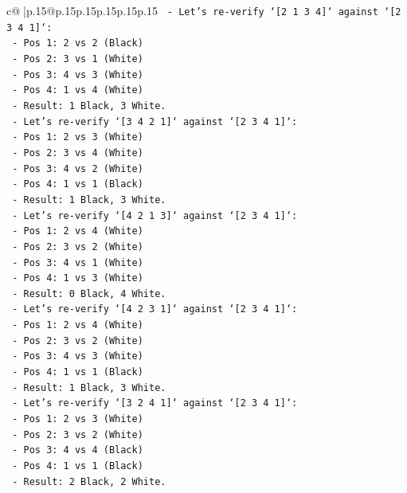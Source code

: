\documentclass{article}
\begin{document}
{\begin{supertabular}{c@{$\;$}|p{.15\linewidth}@{}p{.15\linewidth}p{.15\linewidth}p{.15\linewidth}p{.15\linewidth}p{.15\linewidth}}
{{{\texttt{  {-} Let's re{-}verify `{[}2 1 3 4{]}` against `{[}2 3 4 1{]}`:} \\
\texttt{    {-} Pos 1: 2 vs 2 (Black)} \\
\texttt{    {-} Pos 2: 3 vs 1 (White)} \\
\texttt{    {-} Pos 3: 4 vs 3 (White)} \\
\texttt{    {-} Pos 4: 1 vs 4 (White)} \\
\texttt{    {-} Result: 1 Black, 3 White.} \\
\texttt{  {-} Let's re{-}verify `{[}3 4 2 1{]}` against `{[}2 3 4 1{]}`:} \\
\texttt{    {-} Pos 1: 2 vs 3 (White)} \\
\texttt{    {-} Pos 2: 3 vs 4 (White)} \\
\texttt{    {-} Pos 3: 4 vs 2 (White)} \\
\texttt{    {-} Pos 4: 1 vs 1 (Black)} \\
\texttt{    {-} Result: 1 Black, 3 White.} \\
\texttt{  {-} Let's re{-}verify `{[}4 2 1 3{]}` against `{[}2 3 4 1{]}`:} \\
\texttt{    {-} Pos 1: 2 vs 4 (White)} \\
\texttt{    {-} Pos 2: 3 vs 2 (White)} \\
\texttt{    {-} Pos 3: 4 vs 1 (White)} \\
\texttt{    {-} Pos 4: 1 vs 3 (White)} \\
\texttt{    {-} Result: 0 Black, 4 White.} \\
\texttt{  {-} Let's re{-}verify `{[}4 2 3 1{]}` against `{[}2 3 4 1{]}`:} \\
\texttt{    {-} Pos 1: 2 vs 4 (White)} \\
\texttt{    {-} Pos 2: 3 vs 2 (White)} \\
\texttt{    {-} Pos 3: 4 vs 3 (White)} \\
\texttt{    {-} Pos 4: 1 vs 1 (Black)} \\
\texttt{    {-} Result: 1 Black, 3 White.} \\
\texttt{  {-} Let's re{-}verify `{[}3 2 4 1{]}` against `{[}2 3 4 1{]}`:} \\
\texttt{    {-} Pos 1: 2 vs 3 (White)} \\
\texttt{    {-} Pos 2: 3 vs 2 (White)} \\
\texttt{    {-} Pos 3: 4 vs 4 (Black)} \\
\texttt{    {-} Pos 4: 1 vs 1 (Black)} \\
\texttt{    {-} Result: 2 Black, 2 White.} \\
}}}
\end{supertabular}}
\end{document}
